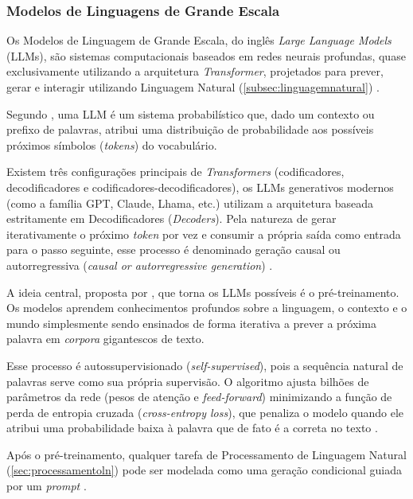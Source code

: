 \documentclass[
    12pt,                %
    openright,           %
    oneside,             %
    a4paper,             %
    english,             %
    brazil               %
]{abntex2}
\begin{document}
\subsubsection{Modelos de Linguagens de Grande Escala}
\label{subsec:llm}
\par
Os Modelos de Linguagem de Grande Escala, do inglês \textit{Large Language Models} (LLMs), são sistemas computacionais baseados em redes neurais profundas, quase exclusivamente utilizando a arquitetura \textit{Transformer}, projetados para prever, gerar e interagir utilizando Linguagem Natural (\ref{subsec:linguagemnatural}) \cite{jurafsky2026speech}.
\par
Segundo , uma LLM é um sistema probabilístico que, dado um contexto ou prefixo de palavras, atribui uma distribuição de probabilidade aos possíveis próximos símbolos (\textit{tokens}) do vocabulário.
\par
Existem três configurações principais de \textit{Transformers} (codificadores, decodificadores e codificadores-decodificadores), os LLMs generativos modernos (como a família GPT, Claude, Lhama, etc.) utilizam a arquitetura baseada estritamente em Decodificadores (\textit{Decoders}).
Pela natureza de gerar iterativamente o próximo \textit{token} por vez e consumir a própria saída como entrada para o passo seguinte, esse processo é denominado geração causal ou autorregressiva (\textit{causal or autorregressive generation}) \cite{jurafsky2026speech}.
\par
A ideia central, proposta por , que torna os LLMs possíveis é o pré-treinamento.
Os modelos aprendem conhecimentos profundos sobre a linguagem, o contexto e o mundo simplesmente sendo ensinados de forma iterativa a prever a próxima palavra em \textit{corpora} gigantescos de texto.
\par
Esse processo é autossupervisionado (\textit{self-supervised}), pois a sequência natural de palavras serve como sua própria supervisão.
O algoritmo ajusta bilhões de parâmetros da rede (pesos de atenção e \textit{feed-forward}) minimizando a função de perda de entropia cruzada (\textit{cross-entropy loss}), que penaliza o modelo quando ele atribui uma probabilidade baixa à palavra que de fato é a correta no texto \cite{jurafsky2026speech}.
\par
Após o pré-treinamento, qualquer tarefa de Processamento de Linguagem Natural (\ref{sec:processamentoln}) pode ser modelada como uma geração condicional guiada por um \textit{prompt} \cite{jurafsky2026speech}.
\end{document}
